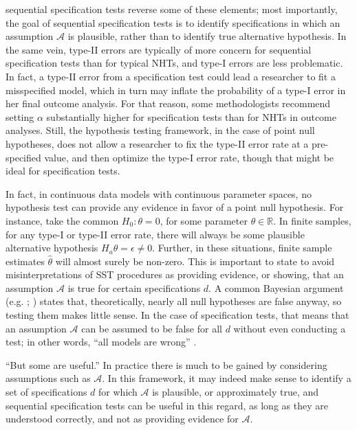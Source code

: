 \documentclass[lineno]{biometrika}\usepackage[]{graphicx}\usepackage[]{color}
\begin{document}
sequential specification tests reverse some of these elements; most importantly, the goal of
sequential specification tests is to identify specifications in which an assumption
$\mathcal{A}$ is plausible, rather than to identify true alternative
hypothesis.
In the same vein, type-II errors are typically of more concern for
sequential specification tests than for typical NHTs, and type-I errors are less problematic.
In fact, a type-II error from a specification test could lead a
researcher to fit a misspecified model, which in turn may inflate the
probability of a type-I error in her final outcome analysis.
For that reason, some methodologists recommend setting $\alpha$
substantially higher for specification tests than for NHTs in outcome
analyses.
Still, the hypothesis testing framework, in the case of point null
hypotheses, does not allow a researcher to
fix the type-II error rate at a pre-specified value, and then optimize
the type-I error rate, though that might be ideal for
specification tests.

In fact, in continuous data models with continuous parameter spaces,
no hypothesis test can provide any evidence in favor of a point null
hypothesis.
For instance, take the common $H_0: \theta=0$, for some parameter
$\theta\in \mathbb{R}$.
In finite samples, for any type-I or type-II error rate, there will
always be some plausible alternative hypothesis $H_a
\theta=\epsilon\ne 0$.
Further, in these situations, finite sample estimates $\hat{\theta}$
will almost surely be non-zero.
This is important to state to avoid misinterpretations of SST
procedures as providing evidence, or showing, that an assumption
$\mathcal{A}$ is true for certain specifications $d$.
A common Bayesian argument (e.g. \citealp[][p. 439]{kadanePrinciples};
\citealp{gelmanBlog}) states that, theoretically, nearly all null
hypotheses are false anyway, so testing them makes little sense.
In the case of specification tests, that means that an assumption
$\mathcal{A}$ can be assumed to be false for all $d$ without even
conducting a test; in other words, ``all models are wrong''
\citep[p. 2]{modelsWrong}.

``But some are useful.''
In practice there is much to be gained by considering assumptions such
as $\mathcal{A}$.
In this framework, it may indeed make sense to identify a set of
specifications $d$ for which $\mathcal{A}$ is plausible, or
approximately true, and
sequential specification tests can be useful in this regard, as long as they are understood
correctly, and not as providing evidence for $\mathcal{A}$.
\end{document}
